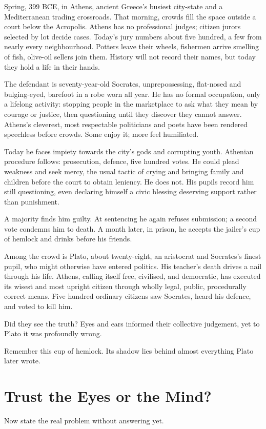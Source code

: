 Spring, 399 BCE, in Athens, ancient Greece's busiest city-state and a Mediterranean trading crossroads. That morning, crowds fill the space outside a court below the Acropolis. Athens has no professional judges; citizen jurors selected by lot decide cases. Today's jury numbers about five hundred, a few from nearly every neighbourhood. Potters leave their wheels, fishermen arrive smelling of fish, olive-oil sellers join them. History will not record their names, but today they hold a life in their hands.

The defendant is seventy-year-old Socrates, unprepossessing, flat-nosed and bulging-eyed, barefoot in a robe worn all year. He has no formal occupation, only a lifelong activity: stopping people in the marketplace to ask what they mean by courage or justice, then questioning until they discover they cannot answer. Athens's cleverest, most respectable politicians and poets have been rendered speechless before crowds. Some enjoy it; more feel humiliated.

Today he faces impiety towards the city's gods and corrupting youth. Athenian procedure follows: prosecution, defence, five hundred votes. He could plead weakness and seek mercy, the usual tactic of crying and bringing family and children before the court to obtain leniency. He does not. His pupils record him still questioning, even declaring himself a civic blessing deserving support rather than punishment.

A majority finds him guilty. At sentencing he again refuses submission; a second vote condemns him to death. A month later, in prison, he accepts the jailer's cup of hemlock and drinks before his friends.

Among the crowd is Plato, about twenty-eight, an aristocrat and Socrates's finest pupil, who might otherwise have entered politics. His teacher's death drives a nail through his life. Athens, calling itself free, civilised, and democratic, has executed its wisest and most upright citizen through wholly legal, public, procedurally correct means. Five hundred ordinary citizens saw Socrates, heard his defence, and voted to kill him.

Did they see the truth? Eyes and ears informed their collective judgement, yet to Plato it was profoundly wrong.

Remember this cup of hemlock. Its shadow lies behind almost everything Plato later wrote.

\section{Trust the Eyes or the Mind?}
Now state the real problem without answering yet.

